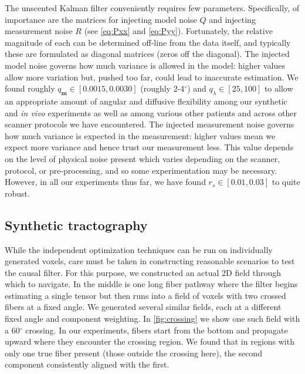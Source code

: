 \documentclass[final,hyperref]{gatech-thesis}
\renewcommand{\deg}{\ensuremath{^\circ}\xspace}
\renewcommand{\v}[1]{\ensuremath{\mathbf #1}\xspace}
\newcommand{\invivo}{\textit{in vivo}\xspace}
\newcommand{\m}{\v m}
\begin{document}
The unscented Kalman filter conveniently requires few parameters.
Specifically, of importance are the matrices for injecting model noise $Q$ and
injecting measurement noise $R$ (see \autoref{eq:Pxx} and \autoref{eq:Pyy}).
Fortunately, the relative magnitude of each can be determined off-line from
the data itself, and typically these are formulated as diagonal matrices
(zeros off the diagonal).
%
The injected model noise governs how much variance is allowed in the model:
higher values allow more variation but, pushed too far, could lead to
inaccurate estimation.  We found roughly $q_\m \in [0.0015, 0.0030]$ (roughly
2-4\deg) and $q_\lambda \in [25,100]$ to allow an appropriate amount of
angular and diffusive flexibility among our synthetic and \invivo experiments
as well as among various other patients and across other scanner protocols we
have encountered.
%
The injected measurement noise governs how much variance is expected in the
measurement: higher values mean we expect more variance and hence trust our
measurement less.  This value depends on the level of physical noise present
which varies depending on the scanner, protocol, or pre-processing, and so
some experimentation may be necessary.  However, in all our experiments thus
far, we have found $r_s \in [0.01, 0.03]$ to quite robust.



\subsection{Synthetic tractography}  \label{sec:tracts}

While the independent optimization techniques can be run on individually
generated voxels, care must be taken in constructing reasonable scenarios to
test the causal filter.  For this purpose, we constructed an actual 2D field
through which to navigate.  In the middle is one long fiber pathway where the
filter begins estimating a single tensor but then runs into a field of voxels
with two crossed fibers at a fixed angle.  We generated several similar
fields, each at a different fixed angle and component weighting.
%
In \autoref{fig:crossing} we show one such field with a 60\deg crossing.  In
our experiments, fibers start from the bottom and propagate upward where they
encounter the crossing region.
%
We found that in regions with only one true fiber present (those outside the
crossing here), the second component consistently aligned with the first.
\end{document}
